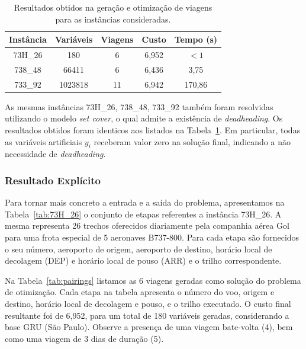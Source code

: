 \documentclass[12pt,a4paper]{article}
\begin{document}
\begin{table}[htb]
	\begin{center} 
		\begin{tabular}{|c|c|c|c|c|}
			\hline 
			{\bf Instância} & {\bf Variáveis} & {\bf Viagens} & {\bf Custo} & {\bf Tempo (s)} \\ 
			\hline \hline
			73H\_26 & 180 & 6 & 6,952 & $< 1$ \\ 
			738\_48 & 66411 & 6 & 6,436 & 3,75 \\
			733\_92 & 1023818 & 11 & 6,942 & 170,86 \\ \hline
		\end{tabular}
		\caption{Resultados obtidos na geração e otimização de viagens para as instâncias consideradas.}
		\label{tab:resultados}
	\end{center}
\end{table}

As mesmas instâncias 73H\_26, 738\_48, 733\_92 também foram resolvidas utilizando o modelo 
{\it set cover}, o qual admite a existência de {\it deadheading}. Os resultados obtidos foram 
identicos aos listados na Tabela~\ref{tab:resultados}. Em particular, todas as variáveis 
artificiais $y_i$ receberam valor zero na solução final, indicando a não necessidade de 
{\it deadheading}.


\subsubsection{Resultado Explícito}
\label{sec:resultado_explicito}

Para tornar mais concreto a entrada e a saída do problema, apresentamos na Tabela~\ref{tab:73H_26}
o conjunto de etapas referentes a instância 73H\_26. A mesma representa 26 trechos oferecidos
diariamente pela companhia aérea Gol para uma frota especial de 5 aeronaves B737-800. Para cada 
etapa são fornecidos o seu número, aeroporto de origem, aeroporto de destino, horário local de 
decolagem (DEP) e horário local de pouso (ARR) e o trilho correspondente.

Na Tabela~\ref{tab:pairings} listamos as 6 viagens geradas como solução do problema de otimização.
Cada etapa na tabela apresenta o número do voo, origem e destino, horário local de decolagem e 
pouso, e o trilho executado. O custo final resultante foi de 6,952, para um total de 180 variáveis 
geradas, considerando a base GRU (São Paulo). Observe a presença de uma viagem bate-volta (4),
bem como uma viagem de 3 dias de duração (5).
\end{document}

